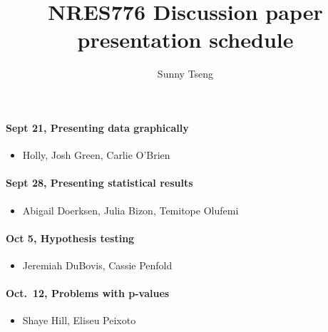 \documentclass[
  letterpaper,
  DIV=11,
  numbers=noendperiod]{scrartcl}
\title{NRES776 Discussion paper presentation schedule}
\author{Sunny Tseng}
\date{}
\let\oldparagraph\paragraph
\renewcommand{\paragraph}[1]{\oldparagraph{#1}\mbox{}}
\providecommand{\tightlist}{%
  \setlength{\itemsep}{0pt}\setlength{\parskip}{0pt}}\usepackage{longtable,booktabs,array}
\begin{document}
\maketitle
\ifdefined\Shaded\renewenvironment{Shaded}{\begin{tcolorbox}[frame hidden, boxrule=0pt, sharp corners, breakable, enhanced, borderline west={3pt}{0pt}{shadecolor}, interior hidden]}{\end{tcolorbox}}\fi

\hypertarget{sept-21-presenting-data-graphically}{%
\paragraph{Sept 21, Presenting data
graphically}\label{sept-21-presenting-data-graphically}}

\begin{itemize}
\tightlist
\item
  Holly, Josh Green, Carlie O'Brien
\end{itemize}

\hypertarget{sept-28-presenting-statistical-results}{%
\paragraph{Sept 28, Presenting statistical
results}\label{sept-28-presenting-statistical-results}}

\begin{itemize}
\tightlist
\item
  Abigail Doerksen, Julia Bizon, Temitope Olufemi
\end{itemize}

\hypertarget{oct-5-hypothesis-testing}{%
\paragraph{Oct 5, Hypothesis testing}\label{oct-5-hypothesis-testing}}

\begin{itemize}
\tightlist
\item
  Jeremiah DuBovis, Cassie Penfold
\end{itemize}

\hypertarget{oct.-12-problems-with-p-values}{%
\paragraph{Oct.~12, Problems with
p-values}\label{oct.-12-problems-with-p-values}}

\begin{itemize}
\tightlist
\item
  Shaye Hill, Eliseu Peixoto
\end{itemize}
\end{document}
